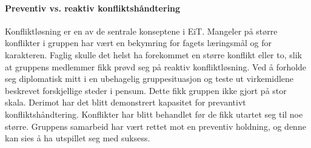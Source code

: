 \paragraph{Preventiv vs. reaktiv konfliktshåndtering}
Konfliktløsning er en av de sentrale konseptene i EiT.
Mangeler på større konflikter i gruppen har vært en bekymring for fagets læringsmål og for karakteren. 
Faglig skulle det helst ha forekommet en større konflikt eller to, slik at gruppens medlemmer fikk prøvd seg på reaktiv konfliktløsning. 
Ved å forholde seg diplomatisk mitt i en ubehagelig gruppesituasjon og teste ut virkemidlene beskrevet forskjellige steder i pensum. 
Dette fikk gruppen ikke gjort på stor skala.
Derimot har det blitt demonstrert kapasitet for prevantivt konfliktshåndtering. 
Konflikter har blitt behandlet før de fikk utartet seg til noe større. 
Gruppens samarbeid har vært rettet mot en preventiv holdning, og denne kan sies å ha utspillet seg med suksess. 

